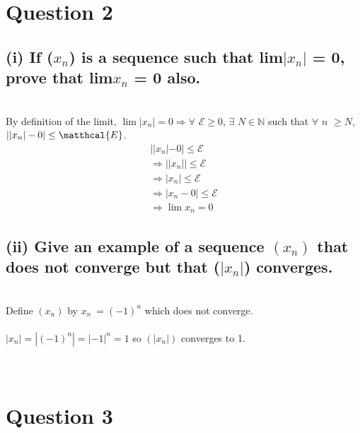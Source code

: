 \documentclass{article}
\begin{document}
\section*{Question 2}
\subsection*{(i) If (\(x_n\)) is a sequence such that lim\(|x_n|\) = 0, prove that lim\(x_n\) = 0 also.}

\solution
\\
By definition of the limit, \(\lim|x_n| = 0 \Rightarrow \forall\) \(\mathcal{E} \geq 0\), \(\exists\) \(N \in \mathds{N}\) such that \(\forall\) \(n\) \(\geq N\), \(||x_n| - 0| \leq \matthcal{E}\).
\begin{align}
  \label{}
  ||x_n| - 0| \leq \mathcal{E} \nonumber \\
  \Rightarrow ||x_n|| \leq \mathcal{E} \nonumber \\
  \Rightarrow |x_n| \leq \mathcal{E} \nonumber \\
  \Rightarrow |x_n - 0| \leq \mathcal{E} \nonumber \\
  \Rightarrow \lim x_n = 0 \nonumber
\end{align}

\subsection*{(ii) Give an example of a sequence \((x_n)\) that does not converge but that (\(|x_n|\)) converges.}
\solution
\\
Define \((x_n)\) by \(x_n\ = (-1)^n\) which does not converge.
\\
\\
\(|x_n| = |(-1)^n| = |-1|^n = 1\) so \((|x_n|)\) converges to 1.
\\\\\\
\section*{Question 3}
\end{document}
